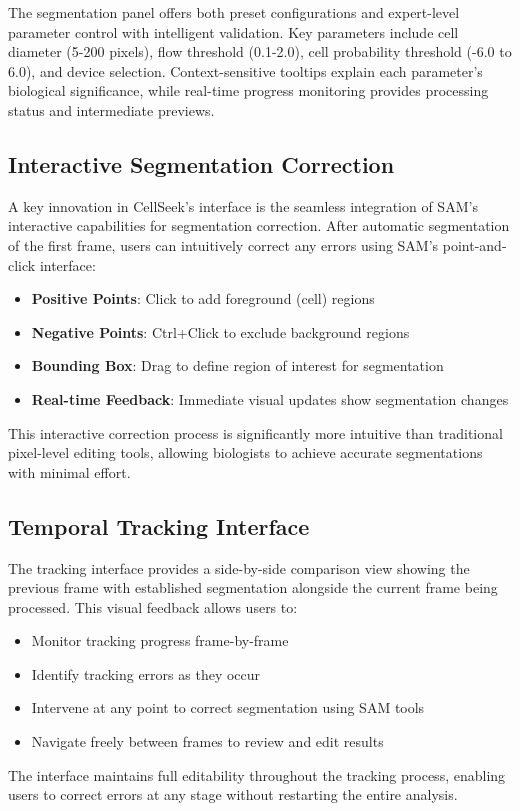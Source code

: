 \documentclass[../cellseek_paper.tex]{subfiles}
\begin{document}
The segmentation panel offers both preset configurations and expert-level parameter control with intelligent validation. Key parameters include cell diameter (5-200 pixels), flow threshold (0.1-2.0), cell probability threshold (-6.0 to 6.0), and device selection. Context-sensitive tooltips explain each parameter's biological significance, while real-time progress monitoring provides processing status and intermediate previews.

\subsection{Interactive Segmentation Correction}

A key innovation in CellSeek's interface is the seamless integration of SAM's interactive capabilities for segmentation correction. After automatic segmentation of the first frame, users can intuitively correct any errors using SAM's point-and-click interface:

\begin{itemize}
  \item \textbf{Positive Points}: Click to add foreground (cell) regions
  \item \textbf{Negative Points}: Ctrl+Click to exclude background regions
  \item \textbf{Bounding Box}: Drag to define region of interest for segmentation
  \item \textbf{Real-time Feedback}: Immediate visual updates show segmentation changes
\end{itemize}

This interactive correction process is significantly more intuitive than traditional pixel-level editing tools, allowing biologists to achieve accurate segmentations with minimal effort.

\subsection{Temporal Tracking Interface}

The tracking interface provides a side-by-side comparison view showing the previous frame with established segmentation alongside the current frame being processed. This visual feedback allows users to:

\begin{itemize}
  \item Monitor tracking progress frame-by-frame
  \item Identify tracking errors as they occur
  \item Intervene at any point to correct segmentation using SAM tools
  \item Navigate freely between frames to review and edit results
\end{itemize}

The interface maintains full editability throughout the tracking process, enabling users to correct errors at any stage without restarting the entire analysis.
\end{document}
